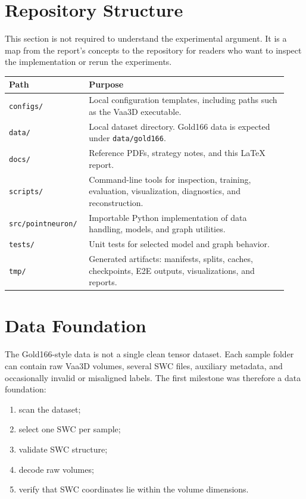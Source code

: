 \documentclass[11pt]{article}
\begin{document}
\section{Repository Structure}

This section is not required to understand the experimental argument. It is a
map from the report's concepts to the repository for readers who want to inspect
the implementation or rerun the experiments.

\begin{longtable}{p{0.25\linewidth} p{0.68\linewidth}}
\toprule
Path & Purpose \\
\midrule
\texttt{configs/} & Local configuration templates, including paths such as
the Vaa3D executable. \\
\texttt{data/} & Local dataset directory. Gold166 data is expected under
\texttt{data/gold166}. \\
\texttt{docs/} & Reference PDFs, strategy notes, and this LaTeX report. \\
\texttt{scripts/} & Command-line tools for inspection, training, evaluation,
visualization, diagnostics, and reconstruction. \\
\texttt{src/pointneuron/} & Importable Python implementation of data handling,
models, and graph utilities. \\
\texttt{tests/} & Unit tests for selected model and graph behavior. \\
\texttt{tmp/} & Generated artifacts: manifests, splits, caches, checkpoints,
E2E outputs, visualizations, and reports. \\
\bottomrule
\end{longtable}

\section{Data Foundation}

The Gold166-style data is not a single clean tensor dataset. Each sample folder
can contain raw Vaa3D volumes, several SWC files, auxiliary metadata, and
occasionally invalid or misaligned labels. The first milestone was therefore a
data foundation:

\begin{enumerate}
  \item scan the dataset;
  \item select one SWC per sample;
  \item validate SWC structure;
  \item decode raw volumes;
  \item verify that SWC coordinates lie within the volume dimensions.
\end{enumerate}
\end{document}
